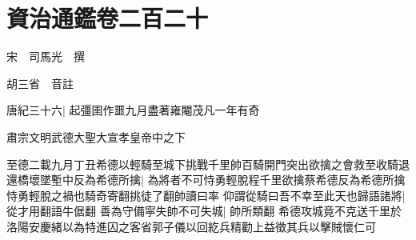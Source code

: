 \section{資治通鑑卷二百二十}
宋　司馬光　撰

胡三省　音註

唐紀三十六|{
	起彊圉作噩九月盡著雍閹茂凡一年有奇}


肅宗文明武德大聖大宣孝皇帝中之下

至德二載九月丁丑希德以輕騎至城下挑戰千里帥百騎開門突出欲擒之會救至收騎退還橋壞墜塹中反為希德所擒|{
	為將者不可恃勇輕脫程千里欲擒蔡希德反為希德所擒恃勇輕脫之禍也騎奇寄翻挑徒了翻帥讀曰率}
仰謂從騎曰吾不幸至此天也歸語諸將|{
	從才用翻語牛倨翻}
善為守備寜失帥不可失城|{
	帥所類翻}
希德攻城竟不克送千里於洛陽安慶緒以為特進囚之客省郭子儀以回紇兵精勸上益徵其兵以擊賊懷仁可

